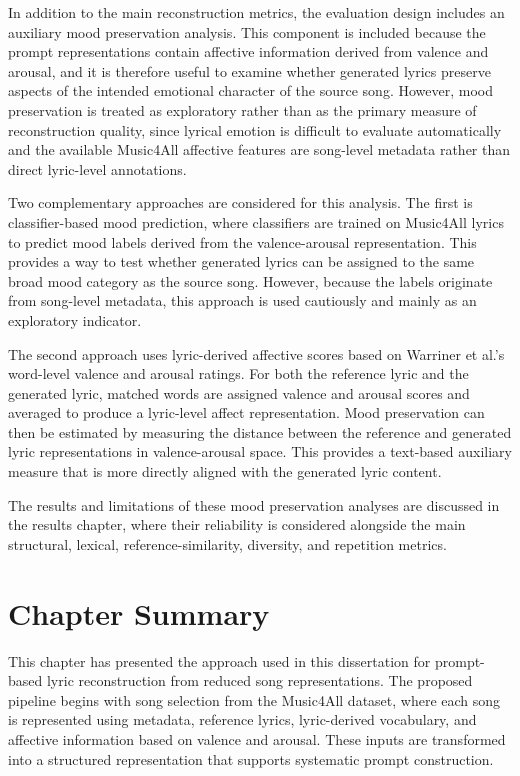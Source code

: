 In addition to the main reconstruction metrics, the evaluation design includes an auxiliary mood preservation analysis. This component is included because the prompt representations contain affective information derived from valence and arousal, and it is therefore useful to examine whether generated lyrics preserve aspects of the intended emotional character of the source song. However, mood preservation is treated as exploratory rather than as the primary measure of reconstruction quality, since lyrical emotion is difficult to evaluate automatically and the available Music4All affective features are song-level metadata rather than direct lyric-level annotations.

Two complementary approaches are considered for this analysis. The first is classifier-based mood prediction, where classifiers are trained on Music4All lyrics to predict mood labels derived from the valence-arousal representation. This provides a way to test whether generated lyrics can be assigned to the same broad mood category as the source song. However, because the labels originate from song-level metadata, this approach is used cautiously and mainly as an exploratory indicator.

The second approach uses lyric-derived affective scores based on Warriner et al.'s word-level valence and arousal ratings. For both the reference lyric and the generated lyric, matched words are assigned valence and arousal scores and averaged to produce a lyric-level affect representation. Mood preservation can then be estimated by measuring the distance between the reference and generated lyric representations in valence-arousal space. This provides a text-based auxiliary measure that is more directly aligned with the generated lyric content.

The results and limitations of these mood preservation analyses are discussed in the results chapter, where their reliability is considered alongside the main structural, lexical, reference-similarity, diversity, and repetition metrics.


\section{Chapter Summary}

This chapter has presented the approach used in this dissertation for prompt-based lyric reconstruction from reduced song representations. The proposed pipeline begins with song selection from the Music4All dataset, where each song is represented using metadata, reference lyrics, lyric-derived vocabulary, and affective information based on valence and arousal. These inputs are transformed into a structured representation that supports systematic prompt construction.

